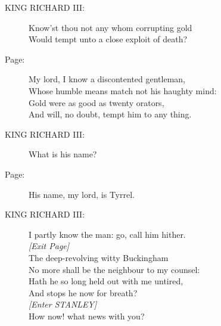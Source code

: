 \documentclass{article}
\begin{document}
\begin{description}
\item[KING RICHARD III:] 
\hspace{1pt}Know'st thou not any whom corrupting gold\\
\hspace{1pt}Would tempt unto a close exploit of death?\\
\end{description}
\begin{description}
\item[Page:] 
\hspace{1pt}My lord, I know a discontented gentleman,\\
\hspace{1pt}Whose humble means match not his haughty mind:\\
\hspace{1pt}Gold were as good as twenty orators,\\
\hspace{1pt}And will, no doubt, tempt him to any thing.\\
\end{description}
\begin{description}
\item[KING RICHARD III:] 
\hspace{1pt}What is his name?\\
\end{description}
\begin{description}
\item[Page:] 
\hspace{1pt}His name, my lord, is Tyrrel.\\
\end{description}
\begin{description}
\item[KING RICHARD III:] 
\hspace{1pt}I partly know the man: go, call him hither.\\
{\it [Exit Page]}\\
\hspace{1pt}The deep-revolving witty Buckingham\\
\hspace{1pt}No more shall be the neighbour to my counsel:\\
\hspace{1pt}Hath he so long held out with me untired,\\
\hspace{1pt}And stops he now for breath?\\
{\it [Enter STANLEY]}\\
\hspace{1pt}How now! what news with you?\\
\end{description}
\end{document}
